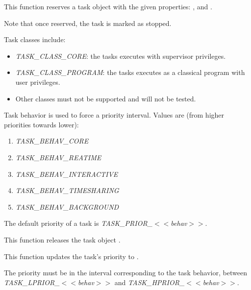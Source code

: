 \begin{itemize}
	 {
	   This function reserves a task object with the given
	   properties: ,  and
	   .

	   Note that once reserved, the task is marked as stopped.

	   Task classes include:

	   \begin{itemize}
	     \item
	       \emph{TASK\_CLASS\_CORE}: the tasks executes with
	       supervisor privileges.
	     \item
	       \emph{TASK\_CLASS\_PROGRAM}: the tasks executes as a
	       classical program with user privileges.
	     \item
	       Other classes must not be supported and will not be
	       tested.
	   \end{itemize}

	   Task behavior is used to force a priority interval. Values
	   are (from higher priorities towards lower):

	   \begin{enumerate}
	     \item \emph{TASK\_BEHAV\_CORE}
	     \item \emph{TASK\_BEHAV\_REATIME}
	     \item \emph{TASK\_BEHAV\_INTERACTIVE}
	     \item \emph{TASK\_BEHAV\_TIMESHARING}
	     \item \emph{TASK\_BEHAV\_BACKGROUND}
	   \end{enumerate}

	   The default priority of a task is
	   \emph{TASK\_PRIOR\_$<<$behav$>>$}.
	 }

\newpage

	 {
	   This function releases the task object .
	 }

	 {
	   This function updates the task's priority to .

	   The priority must be in the interval corresponding to the
	   task behavior, between \emph{TASK\_LPRIOR\_$<<$behav$>>$} and
	   \emph{TASK\_HPRIOR\_$<<$behav$>>$}.
	 }


\end{itemize}
